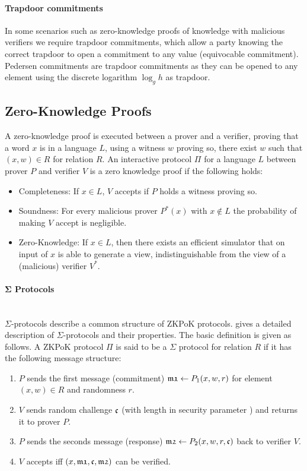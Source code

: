 \paragraph{Trapdoor commitments}
In some scenarios such as zero-knowledge proofs of knowledge with malicious verifiers we require trapdoor commitments, which allow a party knowing the correct trapdoor to open a commitment to any value (equivocable commitment).
Pedersen commitments are trapdoor commitments as they can be opened to any element using the discrete logarithm $\log_g h$ as trapdoor.

\subsection{Zero-Knowledge Proofs}
A zero-knowledge proof is executed between a prover and a verifier, proving that a word $x$ is in a language $L$, using a witness $w$ proving so, \ie there exist $w$ such that $(x,w)\in R$ for relation $R$.
An interactive protocol $\Pi$ for a language $L$ between prover $P$ and verifier $V$ is a zero knowledge proof if the following holds:
\begin{itemize}
	\item Completeness: If $x\in L$, $V$ accepts if $P$ holds a witness proving so.
	\item Soundness: For every malicious prover $P^\ast(x)$ with $x\not\in L$ the probability of making $V$ accept is negligible.
	\item Zero-Knowledge: If $x\in L$, then there exists an efficient simulator \Sim that on input of $x$ is able to generate a view, indistinguishable from the view of a (malicious) verifier $V^\ast$.
\end{itemize}

\paragraph{$\bm{\Sigma}$ Protocols}\hfill\\
$\Sigma$-protocols describe a common structure of \ac{ZKPoK} protocols.
\citet{Damgard10} gives a detailed description of $\Sigma$-protocols and their properties.
The basic definition is given as follows.
A \ac{ZKPoK} protocol $\Pi$ is said to be a $\Sigma$ protocol for relation $R$ if it has the following message structure:
\begin{enumerate}
  \item $P$ sends the first message (commitment) $\mathfrak{m1}\gets P_1(x,w,r)$ for element $(x,w)\in R$ and randomness $r$.
  \item $V$ sends random challenge $\mathfrak{c}$ (with length in security parameter \secpar) and returns it to prover $P$.
  \item $P$ sends the seconds message (response) $\mathfrak{m2}\gets P_2(x,w,r,\mathfrak{c})$ back to verifier $V$.
  \item $V$ accepts iff $(x,\mathfrak{m1},\mathfrak{c},\mathfrak{m2})$ can be verified.
\end{enumerate}

